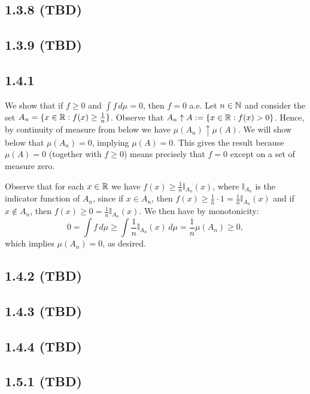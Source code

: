 \documentclass[11pt]{article}
\begin{document}
\subsection*{1.3.8 (TBD)} 

\subsection*{1.3.9 (TBD)}

\subsection*{1.4.1}

We show that if $f \geq 0$ and $\int f \, d\mu = 0$, then $f = 0$ a.e. Let $n \in {\mathbb N}$ and consider the set $A_n = \{x \in {\mathbb R} : f(x) \geq \frac{1}{n}\}$. Observe that $A_n \uparrow A := \{x \in {\mathbb R} : f(x) > 0\}$. Hence, by continuity of measure from below we have $\mu(A_n)\uparrow \mu(A)$. We will show below that $\mu(A_n) = 0$, implying $\mu(A) = 0$. This gives the result because $\mu(A) = 0$ (together with $f \geq 0$) means precisely that $f = 0$ except on a set of measure zero.

Observe that for each $x \in {\mathbb R}$ we have $f(x) \geq  \frac{1}{n} \mathbb{I}_{A_n}(x)$, where $\mathbb{I}_{A_n}$ is the indicator function of $A_n$, since if $x \in A_n$, then $f(x) \geq \frac{1}{n} \cdot 1 = \frac{1}{n}\mathbb{I}_{A_n}(x)$ and if $x \notin A_n$, then $f(x) \geq 0 = \frac{1}{n}\mathbb{I}_{A_n}(x)$. We then have by monotonicity: \[0 = \int f \, d\mu  \geq \int  \frac{1}{n}\mathbb{I}_{A_n}(x)\, d\mu  =  \frac{1}{n}\mu(A_n) \geq 0,\] which implies $\mu(A_n) = 0$, as desired.

\subsection*{1.4.2 (TBD)}

\subsection*{1.4.3 (TBD)}

\subsection*{1.4.4 (TBD)}

\subsection*{1.5.1 (TBD)}
\end{document}
